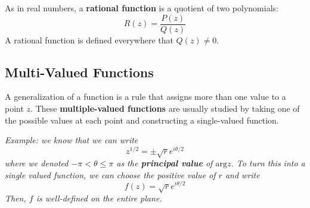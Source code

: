 \documentclass{article}
\renewcommand{\emph}{\textbf}
\begin{document}
As in real numbers, a \emph{rational function} is a quotient of two polynomials:
\[
	R(z) = \frac{P(z)}{Q(z)}
\]
A rational function is defined everywhere that $Q(z) \neq 0$. 


\subsection{Multi-Valued Functions}
A generalization of a function is a rule that assigns more than one value to a point $z$. These \emph{multiple-valued functions} are usually studied by taking one of the possible values at each point and constructing a single-valued function.

\textit{Example: we know that we can write
\[
	z^{1/2} = \pm \sqrt{r} e^{i\theta/2}
\]
where we denoted $-\pi < \theta \leq \pi$ as the \emph{principal value} of $\text{arg} z$. To turn this into a single valued function, we can choose the positive value of $r$ and write
\[
	f(z) = \sqrt{r} e^{i\theta / 2}
\]
Then, $f$ is well-defined on the entire plane.
}
\end{document}
